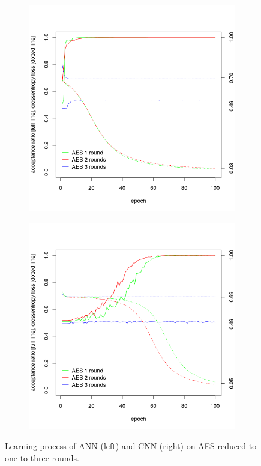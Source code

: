 \documentclass[
  print, %
  Table,   %
  nolof,     %
  nolot,     %
  11pt, %
  oneside  %
]{fithesis3}
\begin{document}
\begin{figure}[H]
\begin{changemargin}{-3cm}{-3cm}
\centering
\begin{subfigure}{.6\textwidth}
  \centering
  \includegraphics[width=.98\textwidth]{./graphics/ann/ann.png}
  \label{fig:ann-learning-ann}
\end{subfigure}%
\begin{subfigure}{.6\textwidth}
  \centering
  \includegraphics[width=.98\textwidth]{./graphics/ann/cnn.png}
  \label{fig:ann-learning-cnn}
\end{subfigure}
\end{changemargin}
\caption{Learning process of ANN (left) and CNN (right) on AES reduced to one to three rounds.}
\label{fig:ann-learning}
\end{figure}
\end{document}
